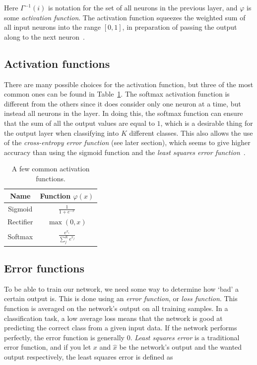 \documentclass{kththesis}
\renewcommand{\arraystretch}{1.2}
\begin{document}
Here $\Gamma^{-1}(i)$ is notation for the set of all neurons in the previous layer, and $\varphi$ is some \textit{activation function}. The activation function squeezes the weighted sum of all input neurons into the range $[0, 1]$, in preparation of passing the output along to the next neuron~\cite{mlfIntro}.

\subsection{Activation functions}
There are many possible choices for the activation function, but three of the most common ones can be found in Table~\ref{tab:activation_functions}. The softmax activation function is different from the others since it does consider only one neuron at a time, but instead all neurons in the layer. In doing this, the softmax function can ensure that the sum of all the output values are equal to $1$, which is a desirable thing for the output layer when classifying into $K$ different classes. This also allows the use of the \textit{cross-entropy error function} (see later section), which seems to give higher accuracy than using the sigmoid function and the \textit{least squares error function}~\cite{dunne1997pairing}.

\begin{table}[h]
  \renewcommand{\arraystretch}{1.2}
  \begin{center}
    \caption{A few common activation functions.}
    \label{tab:activation_functions}
    \begin{tabular}{cc}
      \textbf{Name} & \textbf{Function} $\varphi(x)$\\
      \toprule
      Sigmoid & $\displaystyle \frac{1}{1 + e^{-x}} $ \\[4mm]
      Rectifier & $\displaystyle \max(0, x)$ \\[3mm]
      Softmax & $\displaystyle \frac{e^{x_i}}{\sum_j^K{e^{x_j}}}$ \\
    \end{tabular}
  \end{center}
\end{table}

\subsection{Error functions}
To be able to train our network, we need some way to determine how `bad' a certain output is. This is done using an \textit{error function}, or \textit{loss function}. This function is averaged on the network's output on all training samples. In a classification task, a low average loss means that the network is good at predicting the correct class from a given input data. If the network performs perfectly, the error function is generally $0$. \textit{Least squares error} is a traditional error function, and if you let $x$ and $\hat{x}$ be the network's output and the wanted output respectively, the least squares error is defined as~\cite{mlfIntro}
\end{document}
